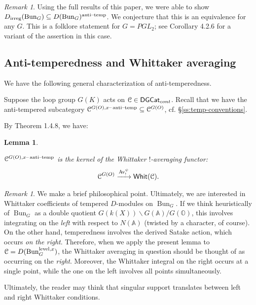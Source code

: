 \documentclass[reqno,11pt]{amsart}
\numberwithin{equation}{subsection}
\newtheorem{lem}[thm]{Lemma}
\theoremstyle{remark}
\newtheorem{rem}[thm]{Remark}
\newcommand{\xar}[1]{\xrightarrow{#1}}
\newcommand{\bA}{{\mathbb A}}
\newcommand{\bO}{{\mathbb O}}
\newcommand{\sC}{{\EuScript C}}
\newcommand{\on}{\operatorname}
\newcommand{\mathendash}{\text{\textendash}}
\newcommand{\Whit}{\mathsf{Whit}}
\newcommand{\Bun}{\on{Bun}}
\newcommand{\DGCat}{\mathsf{DGCat}}
\newcommand{\Av}{\on{Av}}
\renewcommand{\subset}{\subseteq}
\newcommand{\at}{\on{anti}\!\mathendash\!\on{temp}}
\newcommand{\xat}{x\mathendash\on{anti}\!\mathendash\!\on{temp}}
\newcommand{\irreg}{\on{irreg}}
\begin{document}
\begin{rem}

Using the full results of this paper, we were able to show
$D_{\irreg}(\Bun_G) \subset D(\Bun_G)^{\at}$. We conjecture
that this is an equivalence for any $G$.
This is a folklore statement for $G = PGL_2$; see \cite{dario-ramanujan}
Corollary 4.2.6 for a variant of the assertion in this case.

\end{rem}

\subsection{Anti-temperedness and Whittaker averaging}\label{ss:at-whit}

We have the following general characterization of anti-temperedness.

Suppose the loop group $G(K)$ acts on $\sC \in \DGCat_{cont}$. Recall that we have
the anti-tempered subcategory $\sC^{G(O),\xat} \subset \sC^{G(O)}$, cf. \S \ref{ss:temp-conventions}. 

By \cite{dario-ramanujan} Theorem 1.4.8, we have:

\begin{lem}\label{l:at-whit}

$\sC^{G(O),\xat}$ is the kernel of the Whittaker $!$-averaging functor:
%
\[
\sC^{G(O)} \xar{\Av_!^{\psi}} \Whit(\sC).
\]

\end{lem}

\begin{rem}

We make a brief philosophical point. Ultimately, we are interested
in Whittaker coefficients of tempered $D$-modules on $\Bun_G$. 
If we think heuristically of $\Bun_G$ as a double quotient
$G(k(X))\backslash G(\bA)/G(\bO)$, this involves integrating
on the \emph{left} with respect to $N(\bA)$ (twisted by a character, of course).
On the other hand, temperedness involves the derived Satake action, 
which occurs \emph{on the right}. Therefore, when we apply the
present lemma to $\sC = D(\Bun_G^{\on{level},x})$, the Whittaker averaging
in question should be thought of as occurring on the \emph{right}.
Moreover, the Whittaker integral on the right occurs at a single point,
while the one on the left involves all points simultaneously. 

Ultimately, the reader may think that singular support translates
between left and right Whittaker conditions.

\end{rem}
\end{document}
